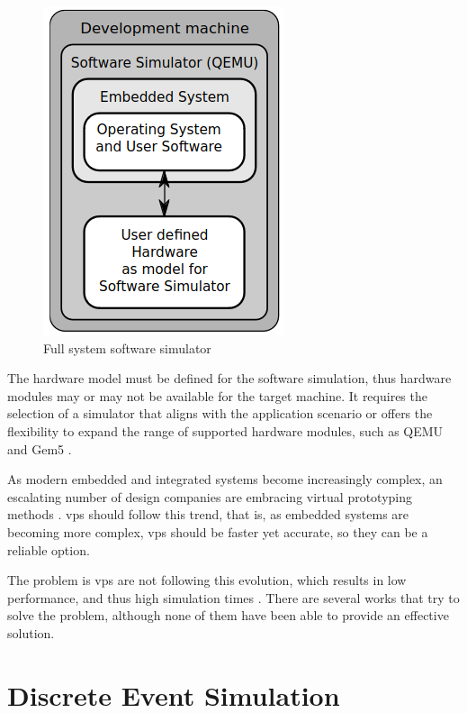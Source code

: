 \begin{figure}[H]
	\centering
 	\includegraphics[width=0.3\linewidth]{Images/FSSsoftware.png}
 	\caption{Full system software simulator \cite{TypesOfFSS}}
	 \label{fig_FSSsoftware}
\end{figure}

The hardware model must be defined for the software simulation, thus hardware modules may or may not be available for the target machine. It requires the selection of a simulator that aligns with the application scenario or offers the flexibility to expand the range of supported hardware modules, such as QEMU \cite{theQEMUsimulator} and Gem5 \cite{TheGem5Simulator}.

As modern embedded and integrated systems become increasingly complex, an escalating number of design companies are embracing virtual prototyping methods \cite{UltraFastVPs}. \Glspl{vp} should follow this trend, that is, as embedded systems are becoming more complex, \glspl{vp} should be faster yet accurate, so they can be a reliable option.

The problem is \glspl{vp} are not following this evolution, which results in low performance, and thus high simulation times \cite{pargem5} \cite{UltraFastVPs} \cite{optimizingTD}. There are several works that try to solve the problem, although none of them have been able to provide an effective solution.

 

\section{Discrete Event Simulation}



